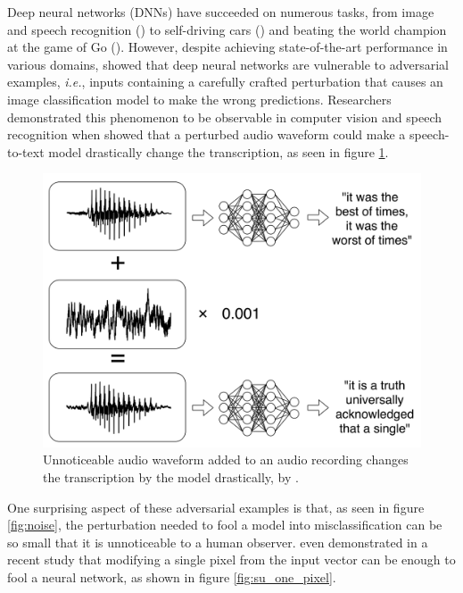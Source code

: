 Deep neural networks (DNNs) have succeeded on numerous tasks, from image and
speech recognition (\cite{russakovsky_imagenet_2015,amodei_deep_2015}) to
self-driving cars (\cite{bojarski_end_2016}) and beating the world champion at
the game of Go (\cite{silver_mastering_2016}). However, despite achieving
state-of-the-art performance in various domains, \cite{szegedy_intriguing_2014}
showed that deep neural networks are vulnerable to adversarial examples,
\emph{i.e.}, inputs containing a carefully crafted perturbation that causes an
image classification model to make the wrong predictions. Researchers
demonstrated this phenomenon to be observable in computer vision and speech
recognition when \cite{carlini_audio_2018} showed that a perturbed audio
waveform could make a speech-to-text model drastically change the transcription,
as seen in figure \ref{fig:carlini_audio}.
\begin{figure}[ht]
    \centering
    \includegraphics[width=.8\linewidth]{Figures/intro/carlini_noise.png}
    \caption{ Unnoticeable audio waveform added to an audio recording changes
        the transcription by the model drastically, by
        \cite{carlini_audio_2018}.}
    \label{fig:carlini_audio}
\end{figure}

One surprising aspect of these adversarial examples is that, as seen in figure
\ref{fig:noise}, the perturbation needed to fool a model into misclassification
can be so small that it is unnoticeable to a human observer. \cite{su_one_2019}
even demonstrated in a recent study that modifying a single pixel from the input
vector can be enough to fool a neural network, as shown in figure
\ref{fig:su_one_pixel}.

